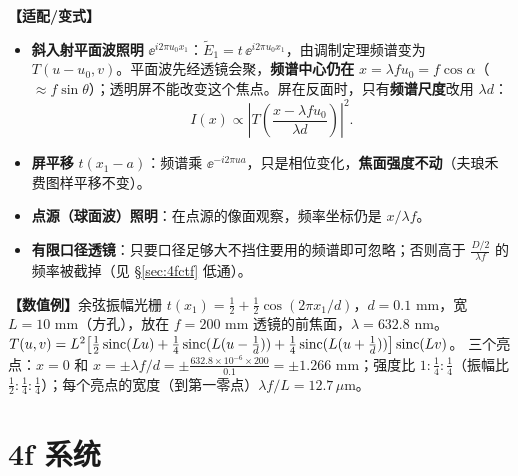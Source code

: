 \textbf{【适配/变式】}
\begin{itemize}
\item \textbf{斜入射平面波照明} $\ee^{i2\pi u_0x_1}$：$\tilde E_1=t\,\ee^{i2\pi u_0x_1}$，由调制定理频谱变为 $T(u-u_0,v)$。平面波先经透镜会聚，\textbf{频谱中心仍在} $x=\lambda fu_0=f\cos\alpha$（$\approx f\sin\theta$）；透明屏不能改变这个焦点。屏在反面时，只有\textbf{频谱尺度}改用 $\lambda d$：
\[
I(x)\propto\left|T\!\left(\frac{x-\lambda fu_0}{\lambda d}\right)\right|^2.
\]
\item \textbf{屏平移} $t(x_1-a)$：频谱乘 $\ee^{-i2\pi ua}$，只是相位变化，\textbf{焦面强度不动}（夫琅禾费图样平移不变）。
\item \textbf{点源（球面波）照明}：在点源的像面观察，频率坐标仍是 $x/\lambda f$。
\item \textbf{有限口径透镜}：只要口径足够大不挡住要用的频谱即可忽略；否则高于 $\frac{D/2}{\lambda f}$ 的频率被截掉（见 §\ref{sec:4fctf} 低通）。
\end{itemize}

\textbf{【数值例】}余弦振幅光栅 $t(x_1)=\frac12+\frac12\cos(2\pi x_1/d)$，$d=0.1$ mm，宽 $L=10$ mm（方孔），放在 $f=200$ mm 透镜的前焦面，$\lambda=632.8$ nm。
$T(u,v)=L^2\big[\frac12\operatorname{sinc}(Lu)+\frac14\operatorname{sinc}(L(u-\frac1d))+\frac14\operatorname{sinc}(L(u+\frac1d))\big]\operatorname{sinc}(Lv)$。
三个亮点：$x=0$ 和 $x=\pm\lambda f/d=\pm\frac{632.8\times10^{-6}\times200}{0.1}=\pm1.266$ mm；强度比 $1:\frac14:\frac14$（振幅比 $\frac12:\frac14:\frac14$）；每个亮点的宽度（到第一零点）$\lambda f/L=12.7\,\mu$m。

\section{4f 系统}\label{sec:4f}

\begin{center}
\end{center}

